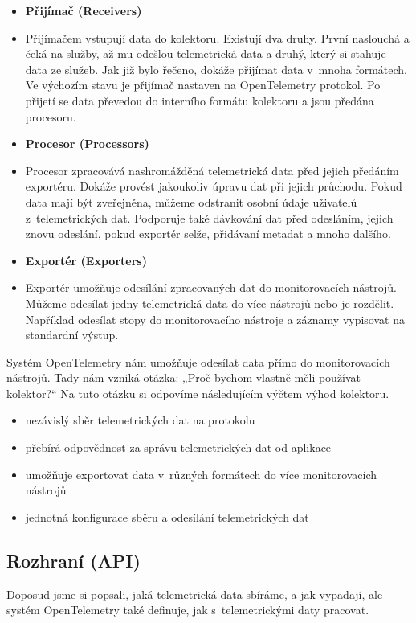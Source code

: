     \begin{itemize}
        \item{\textbf{Přijímač (Receivers)}}
        \item[]
        Přijímačem vstupují data do kolektoru. Existují dva druhy. První naslouchá a čeká na služby, až mu odešlou telemetrická data a druhý, který si stahuje data ze služeb. Jak již bylo řečeno, dokáže přijímat data v~mnoha formátech. Ve výchozím stavu je přijímač nastaven na OpenTelemetry protokol. Po přijetí se data převedou do interního formátu kolektoru a jsou předána procesoru.
        \item{\textbf{Procesor (Processors)}}
        \item[]
        Procesor zpracovává nashromážděná telemetrická data před jejich předáním exportéru. Dokáže provést jakoukoliv úpravu dat při jejich průchodu. Pokud data mají být zveřejněna, můžeme odstranit osobní údaje uživatelů z~telemetrických dat. Podporuje také dávkování dat před odesláním, jejich znovu odeslání, pokud exportér selže, přidávaní metadat a mnoho dalšího.
        \item{\textbf{Exportér (Exporters)}}
        \item[]
        Exportér umožňuje odesílání zpracovaných dat do monitorovacích nástrojů. Můžeme odesílat jedny telemetrická data do více nástrojů nebo je rozdělit. Například odesílat stopy do monitorovacího nástroje a záznamy vypisovat na standardní výstup.
    \end{itemize}

Systém OpenTelemetry nám umožňuje odesílat data přímo do monitorovacích nástrojů. Tady nám vzniká otázka: „Proč bychom vlastně měli používat kolektor?“ Na tuto otázku si odpovíme následujícím výčtem výhod kolektoru.
    \begin{itemize}
        \item{nezávislý sběr telemetrických dat na protokolu}
        \item{přebírá odpovědnost za správu telemetrických dat od aplikace}
        \item{umožňuje exportovat data v~různých formátech do více monitorovacích nástrojů}
        \item{jednotná konfigurace sběru a odesílání telemetrických dat}
    \end{itemize}
    
\subsection{Rozhraní (API)}
Doposud jsme si popsali, jaká telemetrická data sbíráme, a jak vypadají, ale systém OpenTelemetry také definuje, jak s~telemetrickými daty pracovat.

